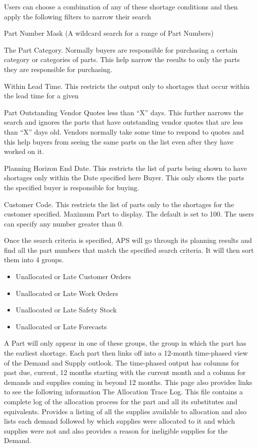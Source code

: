 \documentclass[letterpaper,10pt,english]{sphinxmanual}
\begin{document}
Users can choose a combination of any of these shortage conditions and
then apply the following filters to narrow their search

Part Number Mask (A wildcard search for a range of Part Numbers)

The Part Category. Normally buyers are responsible for purchasing a
certain category or categories of parts. This help narrow the results to
only the parts they are responsible for purchasing.

Within Lead Time.  This restricts the output only to shortages that occur within the lead
time for a given

Part Outstanding Vendor Quotes less than “X” days. This
further narrows the search and ignores the parts that have outstanding
vendor quotes that are less than “X” days old. Vendors normally take
some time to respond to quotes and this help buyers from seeing the same
parts on the list even after they have worked on it.

Planning Horizon End Date. This restricts the list of parts being shown to have shortages
only within the Date specified here Buyer. This only shows the parts the
specified buyer is responsible for buying.

Customer Code. This restricts the list of parts only to the shortages for the customer specified.
Maximum Part to display. The default is set to 100. The users can specify any number greater than 0.

Once the search criteria is specified, APS will go through its planning
results and find all the part numbers that match the specified search
criteria. It will then sort them into 4 groups.
\begin{itemize}
\item {} 
Unallocated or Late Customer Orders

\item {} 
Unallocated or Late Work Orders

\item {} 
Unallocated or Late Safety Stock

\item {} 
Unallocated or Late Forecasts

\end{itemize}

A Part will only appear in one of these groups, the group in which the
part has the earliest shortage. Each part then links off into a 12-month
time-phased view of the Demand and Supply outlook. The time-phased
output has columns for past due, current, 12 months starting with the
current month and a column for demands and supplies coming in beyond 12
months. This page also provides links to see the following information
The Allocation Trace Log. This file contains a complete log of the
allocation process for the part and all its substitutes and equivalents.
Provides a listing of all the supplies available to allocation and also
lists each demand followed by which supplies were allocated to it and
which supplies were not and also provides a reason for ineligible
supplies for the Demand.
\end{document}

